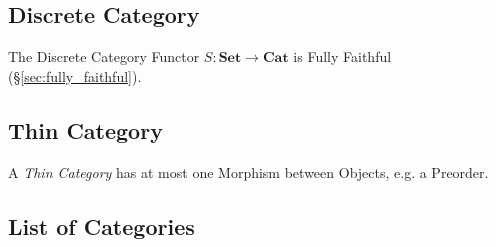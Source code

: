 \subsection{Discrete Category}\label{sec:discrete_category}

The Discrete Category Functor $S : \mathbf{Set} \rightarrow
\mathbf{Cat}$ is Fully Faithful (\S\ref{sec:fully_faithful}).



\subsection{Thin Category}\label{sec:thin_category}

A \emph{Thin Category} has at most one Morphism between Objects, e.g.
a Preorder.



\subsection{List of Categories}\label{sec:categories_list}

